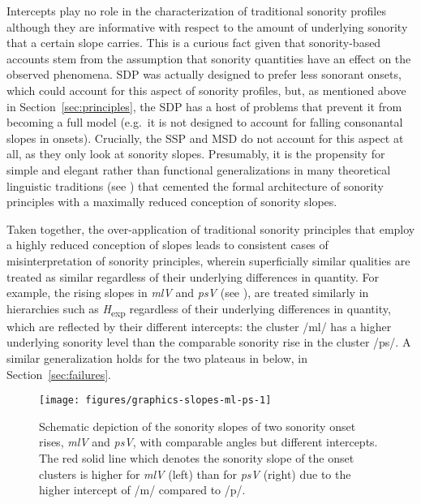 Intercepts play no role in the characterization of traditional sonority profiles although they are informative with respect to the amount of underlying sonority that a certain slope carries. This is a curious fact given that sonority-based accounts stem from the assumption that sonority quantities have an effect on the observed phenomena.  SDP was actually designed to prefer less sonorant onsets, which could account for this aspect of sonority profiles, but, as mentioned above in Section~\ref{sec:principles}, the SDP has a host of problems that prevent it from becoming a full model (e.g.~it is not designed to account for falling consonantal slopes in onsets).
Crucially, the SSP and MSD do not account for this aspect at all, as they only look at sonority slopes.
Presumably, it is the propensity for simple and elegant rather than functional generalizations in many theoretical linguistic traditions (see \citealt{chomsky2021simplicity}) that cemented the formal architecture of sonority principles with a maximally reduced conception of sonority slopes.

Taken together, the over-application of traditional sonority principles that employ a highly reduced conception of slopes leads to consistent cases of misinterpretation of sonority principles, wherein superficially similar qualities are treated as similar regardless of their underlying differences in quantity. For example, the rising slopes in \emph{mlV} and \emph{psV} (see ), are treated similarly in hierarchies such as \emph{H}\textsubscript{exp} regardless of their underlying differences in quantity, which are reflected by their different intercepts:
the cluster /ml/ has a higher underlying sonority level than the comparable sonority rise in the cluster /ps/.
A similar generalization holds for the two plateaus in  below, in Section~\ref{sec:failures}.



\begin{figure}
\texttt{[image: figures/graphics-slopes-ml-ps-1]}
\caption{Schematic depiction of the sonority slopes of two sonority onset rises, \emph{mlV} and \emph{psV}, with comparable angles but different intercepts. The red solid line which denotes the sonority slope of the onset clusters is higher for \emph{mlV} (left) than for \emph{psV} (right) due to the higher intercept of /m/ compared to /p/.}\label{fig:slopes-ml-ps}
\end{figure}

